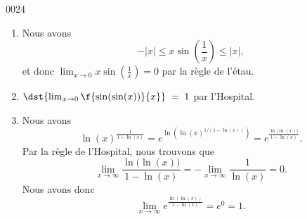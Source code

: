 
\begin{corrige}{0024}

\begin{enumerate}
\item 
Nous avons
\begin{equation}
	-| x |\leq x\sin(\frac{1}{ x })\leq | x |,
\end{equation}
et donc $\lim_{x\to 0}x\sin(\frac{1}{ x })=0$ par la règle de l'étau.

\item
  $\dst{\lim_{x\rightarrow 0} \f{\sin(\sin(x))}{x} } \; = \; 1$ par l'Hospital.

\item

Nous avons
\begin{equation}
	\ln(x)^{\frac{1}{ 1-\ln(x) }}= e^{\ln(  \ln(x)^{1/(1-\ln(x))} )}= e^{\frac{ \ln\big( \ln(x) \big) }{ 1-\ln(x) }}.
\end{equation}
Par la règle de l'Hospital, nous trouvons que
\begin{equation}
	\lim_{x\to\infty}\frac{ \ln\big( \ln(x) \big) }{ 1-\ln(x) }=-\lim_{x\to\infty}\frac{1}{ \ln(x) }=0.
\end{equation}
Nous avons donc
\begin{equation}
	\lim_{x\to\infty} e^{\frac{ \ln( \ln(x)) }{ 1-\ln(x) }}=e^0=1.
\end{equation}

\end{enumerate}

\end{corrige}
